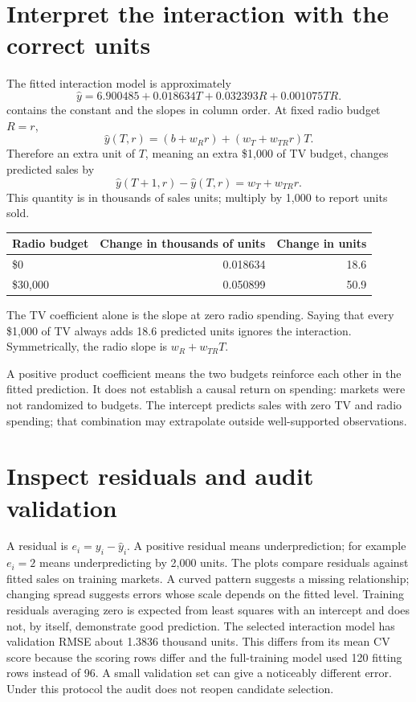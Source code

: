 \section{Interpret the interaction with the correct units}
The fitted interaction model is approximately
\[\hat y=6.900485+0.018634T+0.032393R+0.001075TR.\]
 contains the constant and  the slopes in column order. At fixed radio budget $R=r$,
\[\hat y(T,r)=(b+w_Rr)+(w_T+w_{TR}r)T.\]
Therefore an extra unit of $T$, meaning an extra \$1,000 of TV budget, changes predicted sales by
\[\hat y(T+1,r)-\hat y(T,r)=w_T+w_{TR}r.\]
This quantity is in thousands of sales units; multiply by 1,000 to report units sold.
\begin{center}
\begin{tabular}{lrr}\toprule
Radio budget&Change in thousands of units&Change in units\\\midrule
\$0&0.018634&18.6\\
\$30,000&0.050899&50.9\\\bottomrule
\end{tabular}
\end{center}
The TV coefficient alone is the slope at zero radio spending. Saying that every \$1,000 of TV always adds 18.6 predicted units ignores the interaction. Symmetrically, the radio slope is $w_R+w_{TR}T$.

A positive product coefficient means the two budgets reinforce each other in the fitted prediction. It does not establish a causal return on spending: markets were not randomized to budgets. The intercept predicts sales with zero TV and radio spending; that combination may extrapolate outside well-supported observations.

\section{Inspect residuals and audit validation}
A residual is $e_i=y_i-\hat y_i$. A positive residual means underprediction; for example $e_i=2$ means underpredicting by 2,000 units. The plots compare residuals against fitted sales on training markets.
A curved pattern suggests a missing relationship; changing spread suggests errors whose scale depends on the fitted level. Training residuals averaging zero is expected from least squares with an intercept and does not, by itself, demonstrate good prediction.
The selected interaction model has validation RMSE about 1.3836 thousand units. This differs from its mean CV score because the scoring rows differ and the full-training model used 120 fitting rows instead of 96. A small validation set can give a noticeably different error. Under this protocol the audit does not reopen candidate selection.

